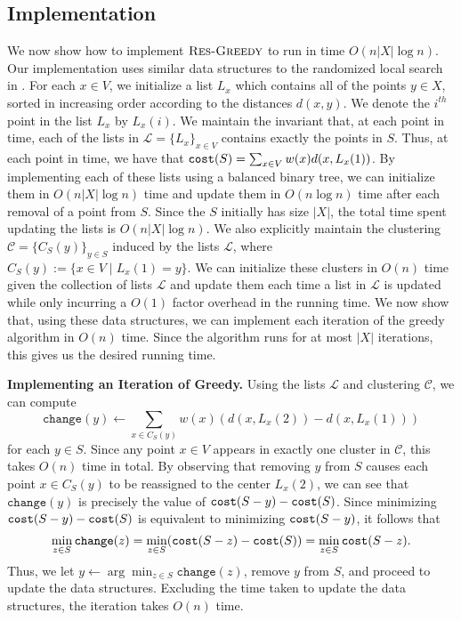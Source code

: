 \documentclass[11pt]{article}
\newcommand{\1}{\mathmybb{1}}
\newcommand{\cost}{\textnormal{\texttt{cost}}}
\newcommand{\Restr}{\textnormal{\textsc{Res-Greedy}}}
\begin{document}
\subsection{Implementation}





We now show how to implement $\Restr$ to run in time $O(n |X| \log n)$. 
Our implementation uses similar data structures to the randomized local search in \cite{focs/BCLP24}. 
For each $x \in V$, we initialize a list $L_x$ which contains all of the points $y \in X$, sorted in increasing order according to the distances $d(x,y)$. We denote the $i^{th}$ point in the list $L_x$ by $L_x(i)$.
We maintain the invariant that, at each point in time, each of the lists in $\mathcal L = \{L_x\}_{x \in V}$ contains exactly the points in $S$.
Thus, at each point in time, we have that
$\cost(S) = \sum_{x \in V} w(x)d(x, L_x(1))$.
By implementing each of these lists using a balanced binary tree, we can initialize them in $O(n |X| \log n)$ time and update them in $O(n \log n)$ time after each removal of a point from $S$.
Since the $S$ initially has size $|X|$, the total time spent updating the lists is $O(n|X|\log n)$.
We also explicitly maintain the clustering $\mathcal C = \{C_S(y)\}_{y \in S}$ induced by the lists $\mathcal L$, where $C_S(y) := \{x \in V \mid L_x(1) = y\}$. We can initialize these clusters in $O(n)$ time given the collection of lists $\mathcal L$ and update them each time a list in $\mathcal L$ is updated while only incurring a $O(1)$ factor overhead in the running time. We now show that, using these data structures, we can implement each iteration of the greedy algorithm in $O(n)$ time. Since the algorithm runs for at most $|X|$ iterations, this gives us the desired running time.

\medskip
\noindent \textbf{Implementing an Iteration of Greedy.}
Using the lists $\mathcal L$ and clustering $\mathcal C$, we can compute
$$ \texttt{change}(y) \leftarrow \sum_{x \in C_S(y)} w(x)(d(x,L_x(2)) - d(x,L_x(1)) ) $$
for each $y \in S$.
Since any point $x \in V$ appears in exactly one cluster in $\mathcal C$, this takes $O(n)$ time in total.
By observing that removing $y$ from $S$ causes each point $x \in C_S(y)$ to be reassigned to the center $L_x(2)$,
we can see that $\texttt{change}(y)$ is precisely the value of $\cost(S - y) - \cost(S)$. Since minimizing $\cost(S - y) - \cost(S)$ is equivalent to minimizing $\cost(S - y)$, it follows that
$$ \min_{z \in S}\texttt{change}(z) = \min_{z \in S} (\cost(S - z) - \cost(S)) = \min_{z \in S} \cost(S - z). $$
Thus, we let $y \leftarrow \arg \min_{z \in S}\texttt{change}(z)$, remove $y$ from $S$, and proceed to update the data structures. Excluding the time taken to update the data structures, the iteration takes $O(n)$ time. 
\end{document}
